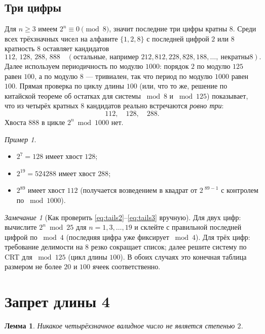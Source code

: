 \documentclass[12pt]{article}
\theoremstyle{plain}
\newtheorem{lemma}{Лемма}
\theoremstyle{remark}
\newtheorem*{remark}{Замечание}
\newtheorem*{example}{Пример}
\begin{document}
\subsection*{Три цифры}
Для $n\ge3$ имеем $2^n\equiv0\pmod8$, значит последние три цифры кратны $8$. Среди всех трёхзначных чисел на алфавите $\{1,2,8\}$ с последней цифрой $2$ или $8$ кратность $8$ оставляет кандидатов
\[
112,\,128,\,288,\,888\quad(\text{остальные, например }212,812,228,828,188,\ldots,~не кратны 8).
\]
Далее используем периодичность по модулю $1000$: порядок $2$ по модулю $125$ равен $100$, а по модулю $8$ — тривиален, так что период по модулю $1000$ равен $100$. Прямая проверка по циклу длины $100$ (или, что то же, решение по китайской теореме об остатках для системы $\bmod 8$ и $\bmod 125$) показывает, что из четырёх кратных $8$ кандидатов реально встречаются \emph{ровно три}:
\begin{equation}\label{eq:tails3}
\boxed{112,\quad 128,\quad 288.}
\end{equation}
Хвоста $888$ в цикле $2^n\bmod1000$ нет.

\begin{example}
\begin{itemize}[nosep]
\item $2^7=128$ имеет хвост $128$;
\item $2^{19}=524288$ имеет хвост $288$;
\item $2^{89}$ имеет хвост $112$ (получается возведением в квадрат от $2^{\! \, \,  89-1}$ с контролем по $\bmod 1000$).
\end{itemize}
\end{example}

\begin{remark}[Как проверить \eqref{eq:tails2}–\eqref{eq:tails3} вручную]
Для двух цифр: вычислите $2^n\bmod25$ для $n=1,3,\ldots,19$ и склейте с правильной последней цифрой по $\bmod4$ (последняя цифра уже фиксирует $\bmod 4$). Для трёх цифр: требование делимости на $8$ резко сокращает список; далее решите систему по CRT для $\bmod 125$ (цикл длины $100$). В обоих случаях это конечная таблица размером не более $20$ и $100$ ячеек соответственно.
\end{remark}

\section{Запрет длины 4}
\begin{lemma}\label{lem:len4}
Никакое четырёхзначное валидное число не является степенью $2$.
\end{lemma}
\end{document}
